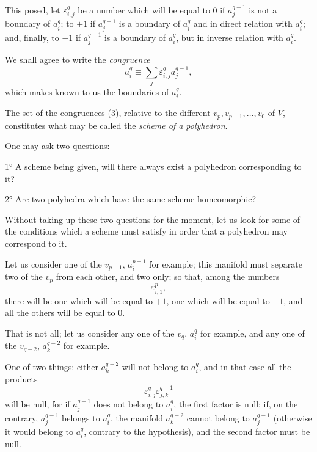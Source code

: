 \documentclass{article}
\begin{document}
This posed, let $\varepsilon^{q}_{i,j}$ be a number which will be equal to 0 if $a^{q-1}_{j}$ is not a boundary of $a^{q}_{i}$; to $+1$ if $a^{q-1}_{j}$ is a boundary of $a^{q}_{i}$ and in direct relation with $a^{q}_{i}$; and, finally, to $-1$ if $a^{q-1}_{j}$ is a boundary of $a^{q}_{i}$, but in inverse relation with $a^{q}_{i}$.

We shall agree to write the \emph{congruence}
\[ a^{q}_{i} \equiv \sum_{j} \varepsilon^{q}_{i,j} a^{q-1}_{j}, \tag{3} \]
which makes known to us the boundaries of $a^{q}_{i}$.

The set of the congruences (3), relative to the different $v_{p}, v_{p-1}, \ldots, v_{0}$ of $V$, constitutes what may be called the \emph{scheme of a polyhedron}.

One may ask two questions:

1° A scheme being given, will there always exist a polyhedron corresponding to it?

2° Are two polyhedra which have the same scheme homeomorphic?

Without taking up these two questions for the moment, let us look for
some of the conditions which a scheme must satisfy in order that a polyhedron may correspond to it.

Let us consider one of the $v_{p-1}$, $a^{p-1}_{i}$ for example; this manifold must separate two of the $v_{p}$ from each other, and two only; so that, among the numbers
\[ \varepsilon^{p}_{i,1}, \]
there will be one which will be equal to $+1$, one which will be equal to $-1$, and all the others will be equal to 0.

That is not all; let us consider any one of the $v_{q}$, $a^{q}_{i}$ for example, and any one of the $v_{q-2}$, $a^{q-2}_{k}$ for example.

One of two things: either $a^{q-2}_{k}$ will not belong to $a^{q}_{i}$, and in that case all the products
\[ \varepsilon^{q}_{i,j} \varepsilon^{q-1}_{j,k} \tag{4} \]
will be null, for if $a^{q-1}_{j}$ does not belong to $a^{q}_{i}$, the first factor is null; if, on the contrary, $a^{q-1}_{j}$ belongs to $a^{q}_{i}$, the manifold $a^{q-2}_{k}$ cannot belong to $a^{q-1}_{j}$ (otherwise it would belong to $a^{q}_{i}$, contrary to the hypothesis), and the second factor must be null.
\end{document}
